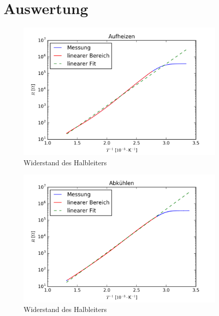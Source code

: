 \documentclass[a4paper]{scrartcl}
\begin{document}
\section{Auswertung}
%
\begin{figure}[htbp]
\centering
\includegraphics[width=0.9\textwidth]{temp_heat.png}
\caption{Widerstand des Halbleiters}
\label{temp_heat}
\end{figure}
%
%
\begin{figure}[htbp]
\centering
\includegraphics[width=0.9\textwidth]{temp_cool.png}
\caption{Widerstand des Halbleiters}
\label{temp_cool}
\end{figure}
%
\end{document}
